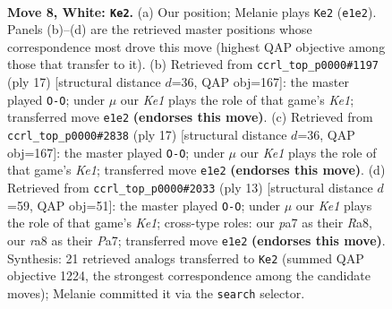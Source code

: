 \documentclass[11pt]{article}
\begin{document}
\begin{figure}[p]\centering
\begin{subfigure}{0.46\textwidth}\centering
\resizebox{\linewidth}{!}{%
\newchessgame
\chessboard[
  setfen={r1bqk2r/ppp1ppbp/1nnp2p1/4P3/3P4/1B3N2/PPP2PPP/RNBQK1R1 w Qkq - 6 8},
  showmover=false,
  pgfstyle=straightmove, color=movearrow, markmove={e1-e2}
]}
\caption{}
\end{subfigure}\hfill
\begin{subfigure}{0.46\textwidth}\centering
\resizebox{\linewidth}{!}{%
\newchessgame
\chessboard[
  setfen={rnbqk2r/pp3ppp/1b3n2/3p4/4p3/1NNP2P1/PP2PPBP/R1BQK2R b KQkq - 4 9},
  showmover=false,
  pgfstyle=straightmove, color=movearrow, markmove={e8-g8}
]}
\caption{}
\end{subfigure}
\\[4pt]
\begin{subfigure}{0.46\textwidth}\centering
\resizebox{\linewidth}{!}{%
\newchessgame
\chessboard[
  setfen={rnbqk2r/pp3ppp/1b3n2/3p4/4p3/1NNP2P1/PP2PPBP/R1BQK2R b KQkq - 4 9},
  showmover=false,
  pgfstyle=straightmove, color=movearrow, markmove={e8-g8}
]}
\caption{}
\end{subfigure}\hfill
\begin{subfigure}{0.46\textwidth}\centering
\resizebox{\linewidth}{!}{%
\newchessgame
\chessboard[
  setfen={rn1qk2r/pbp1bppp/1p2pn2/3p2B1/2PP4/P1N1PN2/1P3PPP/R2QKB1R b KQkq - 0 7},
  showmover=false,
  pgfstyle=straightmove, color=movearrow, markmove={e8-g8}
]}
\caption{}
\end{subfigure}
\caption{\textbf{Move 8, White: \texttt{Ke2}.} (a) Our position; Melanie plays \texttt{Ke2} (\texttt{e1e2}). Panels (b)--(d) are the retrieved master positions whose correspondence most drove this move (highest QAP objective among those that transfer to it). (b) Retrieved from \texttt{ccrl\_top\_p0000\#1197} (ply 17) [structural distance $d$=36, QAP obj=167]: the master played \texttt{O-O}; under $\mu$ our \emph{Ke1} plays the role of that game's \emph{Ke1}; transferred move \texttt{e1e2} \textbf{(endorses this move)}. (c) Retrieved from \texttt{ccrl\_top\_p0000\#2838} (ply 17) [structural distance $d$=36, QAP obj=167]: the master played \texttt{O-O}; under $\mu$ our \emph{Ke1} plays the role of that game's \emph{Ke1}; transferred move \texttt{e1e2} \textbf{(endorses this move)}. (d) Retrieved from \texttt{ccrl\_top\_p0000\#2033} (ply 13) [structural distance $d$=59, QAP obj=51]: the master played \texttt{O-O}; under $\mu$ our \emph{Ke1} plays the role of that game's \emph{Ke1}; cross-type roles: our \emph{p}a7 as their \emph{R}a8, our \emph{r}a8 as their \emph{P}a7; transferred move \texttt{e1e2} \textbf{(endorses this move)}. Synthesis: 21 retrieved analogs transferred to \texttt{Ke2} (summed QAP objective 1224, the strongest correspondence among the candidate moves); Melanie committed it via the \texttt{search} selector.}
\label{fig:thought-m14}
\end{figure}
\end{document}
